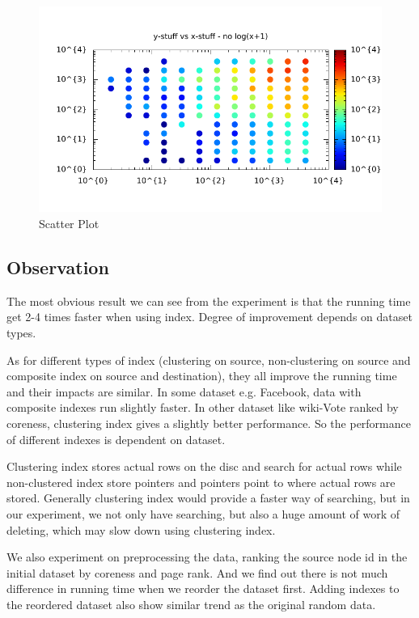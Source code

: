 \begin{figure}[H]
\centering
\includegraphics[width=0.8\linewidth]{p2p_scatter}
\caption{Scatter Plot}
\end{figure}

\subsection{Observation}

The most obvious result we can see from the experiment is that the running time get 2-4 times faster when using index. Degree of improvement depends on dataset types. \par

As for different types of index (clustering on source, non-clustering on source and composite index on source and destination), they all improve the running time and their impacts are similar. In some dataset e.g. Facebook, data with composite indexes run slightly faster. In other dataset like wiki-Vote ranked by coreness, clustering index gives a slightly better performance. So the performance of different indexes is dependent on dataset. \par

Clustering index stores actual rows on the disc and search for actual rows while non-clustered index store pointers and pointers point to where actual rows are stored. Generally clustering index would provide a faster way of searching, but in our experiment, we not only have searching, but also a huge amount of work of deleting, which may slow down using clustering index. \cite{MSR} \par

We also experiment on preprocessing the data, ranking the source node id in the initial dataset by coreness and page rank. And we find out there is not much difference in running time when we reorder the dataset first. Adding indexes to the reordered dataset also show similar trend as the original random data. \par

